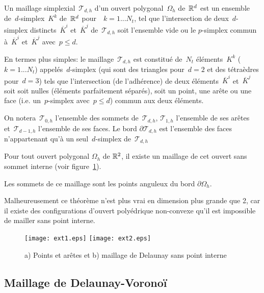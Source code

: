 \medskip
\begin{definition}
Un maillage simplexial~$\mathcal{T}_{d,h}$ d'un ouvert polygonal~$\Omega_h$ de~$\mathbb R^d$ est un ensemble de~$d$-simplex~$K^k$ de~$\mathbb R^d$ pour~~$k = 1... N_t$, tel que l'intersection de deux~$d$-simplex distincts~$\overline{K}^i$ et~$\overline{K}^j$ de~$\mathcal{T}_{d,h}$ soit l'ensemble vide ou le $p$-simplex commun à~$\overline{K}^i$ et~$\overline{K}^j$ avec~$p\le d$.

En termes plus simples: le maillage~$\mathcal{T}_{d,h}$ est constitué de~$N_t$ éléments~$K^k$ ($k = 1... N_t$) appelés~$d$-simplex (qui sont des triangles pour~$d=2$ et des tétraèdres pour~$d=3$) tels que l'intersection (de l'adhérence) de deux éléments~$\overline{K}^i$ et~$\overline{K}^j$ soit soit nulles (éléments parfaitement séparés), soit un  point, une arête ou une face (i.e. un~$p$-simplex avec~$p\le d$) commun aux deux éléments.
\end{definition}

On notera~$\mathcal{T}_{0,h}$ l'ensemble des sommets de~$\mathcal{T}_{d,h}$, $\mathcal{T}_{1,h}$ l'ensemble de ses arêtes et~$\mathcal{T}_{d-1,h}$ l'ensemble de ses faces.
Le bord $\partial\mathcal{T}_{d,h}$ est l'ensemble des faces n'appartenant qu'à un seul~$d$-simplex de~$\mathcal{T}_{d,h}$

\begin{theoreme}
Pour tout ouvert polygonal $\Omega_h$ de $\mathbb R^2$, il existe un maillage de cet ouvert sans sommet interne (voir figure~\ref{Fig-Mext}).
\end{theoreme}
Les sommets de ce maillage sont les points anguleux du bord $\partial\Omega_h$.

Malheureusement ce théorème n'est plus vrai en dimension plus grande que 2, car il existe des configurations d'ouvert polyédrique non-convexe qu'il est impossible de mailler sans point interne.
\begin{figure}[htb]
\begin{center}
\texttt{[image: ext1.eps]} \hspace{2em} \texttt{[image: ext2.eps]}
\end{center}
\caption{a) Points et arêtes et b) maillage de Delaunay sans point interne}\label{Fig-Mext}
\end{figure}


\medskip
\subsection{Maillage de Delaunay-Voronoï}

